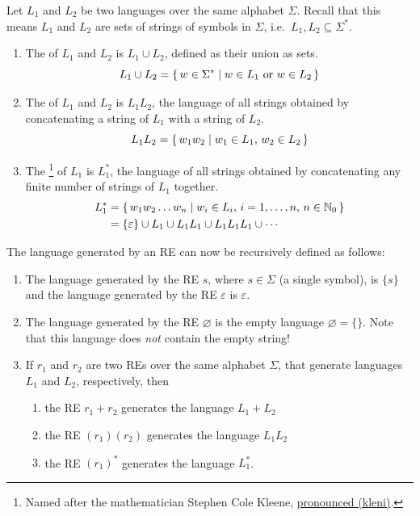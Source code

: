 Let $L_1$ and $L_2$ be two languages over the same alphabet $\Sigma$. Recall that this means $L_1$ and $L_2$ are sets of strings of symbols in $\Sigma$, i.e.\ $L_1, L_2 \subseteq \Sigma^*$.
\begin{enumerate}
\item The  of $L_1$ and $L_2$ is $L_1 \cup L_2$, defined as their union as sets.
\begin{equation*}
L_1 \cup L_2 = \qty{\, w \in \Sigma^* \mid w \in L_1 ~\text{or}~ w \in L_2 \,}
\end{equation*}

\item The  of $L_1$ and $L_2$ is $L_1 L_2$, the language of all strings obtained by concatenating a string of $L_1$ with a string of $L_2$.
\begin{equation*}
L_1 L_2 = \qty{\, w_1 w_2 \mid w_1 \in L_1,\, w_2 \in L_2 \,}
\end{equation*}

\item The \footnote{Named after the mathematician Stephen Cole Kleene, \href{https://foldoc.org/Stephen+Kleene}{pronounced  (\textipa{\textprimstress}kle\textsci ni)}.} of $L_1$ is $L_1^*$, the language of all strings obtained by concatenating any finite number of strings of $L_1$ together.
\begin{align*}
L_1^* & = \qty{\, w_1 w_2 \dots w_n \mid w_i \in L_i,\, i = 1, \ldots, n,\, n \in \mathbb N_0 \,} \\
& = \{\varepsilon\} \cup L_1 \cup L_1 L_1 \cup L_1 L_1 L_1 \cup \cdots
\end{align*}
\end{enumerate}

The language generated by an RE can now be recursively defined as follows:
\begin{enumerate}
\item The language generated by the RE $s$, where $s \in \Sigma$ (a single symbol), is $\{s\}$ and the language generated by the RE $\varepsilon$ is ${\varepsilon}$.
\item The language generated by the RE $\varnothing$ is the empty language $\varnothing = \{\}$. Note that this language does \emph{not} contain the empty string!
\item If $r_1$ and $r_2$ are two REs over the same alphabet $\Sigma$, that generate languages $L_1$ and $L_2$, respectively, then
\begin{enumerate}[label = (\roman*)]
\item the RE $r_1 + r_2$ generates the language $L_1 + L_2$
\item the RE $(r_1)(r_2)$ generates the language $L_1 L_2$
\item the RE $(r_1)^*$ generates the language $L_1^*$.
\end{enumerate}
\end{enumerate}

